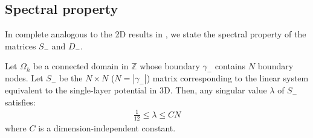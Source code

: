 \subsection{Spectral property}

In complete analogous to the 2D results in \cite{martinsson2009boundary}, we state the spectral property of the matrices $S_-$ and $D_-$.

\begin{theorem}
Let $\Omega_h$ be a connected domain in $\mathbb{Z}$ whose boundary $\gamma_-$ contains $N$ boundary nodes. Let $S_-$ be the $N\times N$ ($N=|\gamma_-|$) matrix corresponding to the linear system equivalent to the single-layer potential in 3D. Then, any singular value $\lambda$ of $S_-$ satisfies:
\begin{align}
\frac{1}{12} \leq  \lambda \leq CN
\end{align}
where $C$ is a dimension-independent constant.
\end{theorem}

